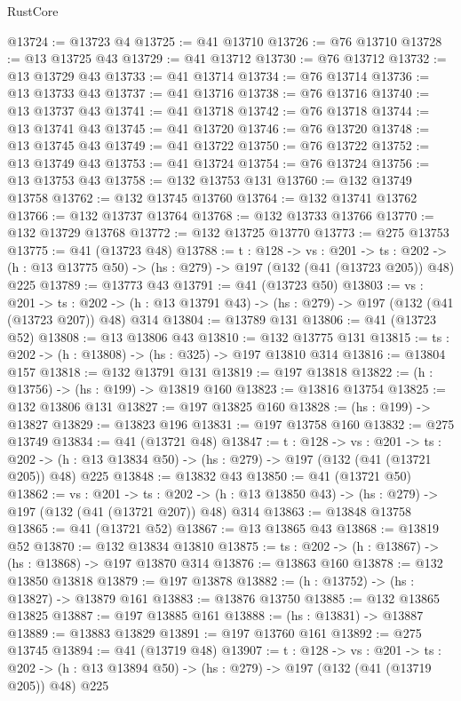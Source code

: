 \begin{lexlean}{RustCore}
\begin{coremodule}
@13724 := @13723 @4
@13725 := @41 @13710
@13726 := @76 @13710
@13728 := @13 @13725 @43
@13729 := @41 @13712
@13730 := @76 @13712
@13732 := @13 @13729 @43
@13733 := @41 @13714
@13734 := @76 @13714
@13736 := @13 @13733 @43
@13737 := @41 @13716
@13738 := @76 @13716
@13740 := @13 @13737 @43
@13741 := @41 @13718
@13742 := @76 @13718
@13744 := @13 @13741 @43
@13745 := @41 @13720
@13746 := @76 @13720
@13748 := @13 @13745 @43
@13749 := @41 @13722
@13750 := @76 @13722
@13752 := @13 @13749 @43
@13753 := @41 @13724
@13754 := @76 @13724
@13756 := @13 @13753 @43
@13758 := @132 @13753 @131
@13760 := @132 @13749 @13758
@13762 := @132 @13745 @13760
@13764 := @132 @13741 @13762
@13766 := @132 @13737 @13764
@13768 := @132 @13733 @13766
@13770 := @132 @13729 @13768
@13772 := @132 @13725 @13770
@13773 := @275 @13753
@13775 := @41 (@13723 @48)
@13788 := {t : @128} ->
  {vs : @201} ->
  {ts : @202} -> (h : @13 @13775 @50) -> (hs : @279) -> @197 (@132 (@41 (@13723 @205)) @48) @225
@13789 := @13773 @43
@13791 := @41 (@13723 @50)
@13803 := {vs : @201} ->
  {ts : @202} -> (h : @13 @13791 @43) -> (hs : @279) -> @197 (@132 (@41 (@13723 @207)) @48) @314
@13804 := @13789 @131
@13806 := @41 (@13723 @52)
@13808 := @13 @13806 @43
@13810 := @132 @13775 @131
@13815 := {ts : @202} -> (h : @13808) -> (hs : @325) -> @197 @13810 @314
@13816 := @13804 @157
@13818 := @132 @13791 @131
@13819 := @197 @13818
@13822 := (h : @13756) -> (hs : @199) -> @13819 @160
@13823 := @13816 @13754
@13825 := @132 @13806 @131
@13827 := @197 @13825 @160
@13828 := (hs : @199) -> @13827
@13829 := @13823 @196
@13831 := @197 @13758 @160
@13832 := @275 @13749
@13834 := @41 (@13721 @48)
@13847 := {t : @128} ->
  {vs : @201} ->
  {ts : @202} -> (h : @13 @13834 @50) -> (hs : @279) -> @197 (@132 (@41 (@13721 @205)) @48) @225
@13848 := @13832 @43
@13850 := @41 (@13721 @50)
@13862 := {vs : @201} ->
  {ts : @202} -> (h : @13 @13850 @43) -> (hs : @279) -> @197 (@132 (@41 (@13721 @207)) @48) @314
@13863 := @13848 @13758
@13865 := @41 (@13721 @52)
@13867 := @13 @13865 @43
@13868 := @13819 @52
@13870 := @132 @13834 @13810
@13875 := {ts : @202} -> (h : @13867) -> (hs : @13868) -> @197 @13870 @314
@13876 := @13863 @160
@13878 := @132 @13850 @13818
@13879 := @197 @13878
@13882 := (h : @13752) -> (hs : @13827) -> @13879 @161
@13883 := @13876 @13750
@13885 := @132 @13865 @13825
@13887 := @197 @13885 @161
@13888 := (hs : @13831) -> @13887
@13889 := @13883 @13829
@13891 := @197 @13760 @161
@13892 := @275 @13745
@13894 := @41 (@13719 @48)
@13907 := {t : @128} ->
  {vs : @201} ->
  {ts : @202} -> (h : @13 @13894 @50) -> (hs : @279) -> @197 (@132 (@41 (@13719 @205)) @48) @225

\end{coremodule}
\end{lexlean}
